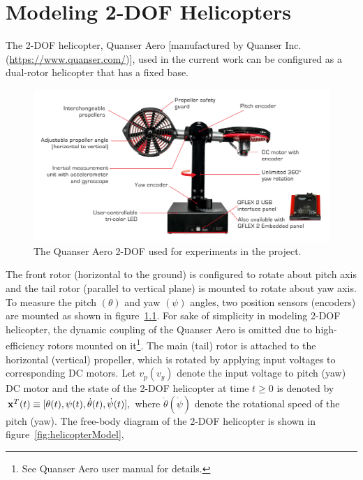 \chapter{Modeling 2-DOF Helicopters}
\label{ch: Chapter2}
The 2-DOF helicopter, Quanser Aero [manufactured by Quanser Inc. (\href{https://www.quanser.com/}{https://www.quanser.com/})], used in the current work can be configured as a dual-rotor helicopter that has a fixed base. 
\begin{figure}[!htbp]
    \centering
    \includegraphics[width=.75\textwidth,keepaspectratio=true]{figs/img/quanserAero.png}
    \caption{The Quanser Aero 2-DOF used for experiments in the project.}
    \label{fig:quanserAero}
\end{figure}
The front rotor (horizontal to the ground) is configured to rotate about pitch axis and the tail rotor (parallel to vertical plane) is mounted to rotate about yaw axis. To measure the pitch $(\theta)$ and yaw $(\psi)$ angles, two position sensors (encoders) are mounted as shown in figure~\ref{fig:quanserAero}. For sake of simplicity in modeling 2-DOF helicopter, the  dynamic coupling of the Quanser Aero is omitted due to high-efficiency rotors mounted on it\footnote{See Quanser Aero user manual for details.}. The main (tail) rotor is attached to the horizontal (vertical) propeller, which is rotated by applying input voltages to corresponding DC motors. Let $v_p(v_y)$ denote the input voltage to pitch (yaw) DC motor and the state of the 2-DOF helicopter at time $t\ge 0$ is denoted by ${\bf x}^T(t) \equiv [\theta(t),\psi(t),\dot\theta(t),\dot\psi(t)],$ where $\dot\theta(\dot\psi)$ denote the rotational speed of the pitch (yaw). The free-body diagram of the 2-DOF helicopter is shown in figure~\ref{fig:helicopterModel}, 

